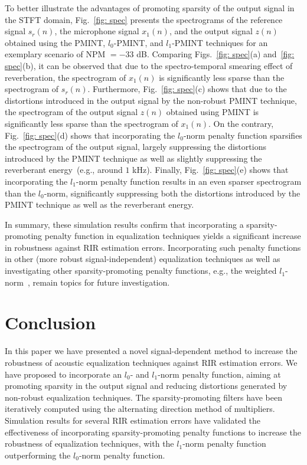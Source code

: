 \documentclass{article}
\begin{document}
To better illustrate the advantages of promoting sparsity of the output signal in the STFT domain, Fig.~\ref{fig: spec} presents the spectrograms of the reference signal $s_r(n)$, the microphone signal $x_1(n)$, and the output signal $z(n)$ obtained using the PMINT, $l_0$-PMINT, and $l_1$-PMINT techniques for an exemplary scenario of NPM $=-33$ dB.
Comparing Figs.~\ref{fig: spec}(a) and~\ref{fig: spec}(b), it can be observed that due to the spectro-temporal smearing effect of reverberation, the spectrogram of $x_1(n)$ is significantly less sparse than the spectrogram of $s_r(n)$.
Furthermore, Fig.~\ref{fig: spec}(c) shows that due to the distortions introduced in the output signal by the non-robust PMINT technique, the spectrogram of the output signal $z(n)$ obtained using PMINT is significantly less sparse than the spectrogram of $x_1(n)$.
On the contrary, Fig.~\ref{fig: spec}(d) shows that incorporating the $l_0$-norm penalty function sparsifies the spectrogram of the output signal, largely suppressing the distortions introduced by the PMINT technique as well as slightly suppressing the reverberant energy~(e.g., around $1$ kHz).
Finally, Fig.~\ref{fig: spec}(e) shows that incorporating the $l_1$-norm penalty function results in an even sparser spectrogram than the $l_0$-norm, significantly suppressing both the distortions introduced by the PMINT technique as well as the reverberant energy.

In summary, these simulation results confirm that incorporating a sparsity-promoting penalty function in equalization techniques yields a significant increase in robustness against RIR estimation errors. 
Incorporating such penalty functions in other (more robust signal-independent) equalization techniques as well as investigating other sparsity-promoting penalty functions, e.g., the weighted $l_1$-norm~\cite{Candes_FA_2008}, remain topics for future investigation.

\section{Conclusion}
In this paper we have presented a novel signal-dependent method to increase the robustness of acoustic equalization techniques against RIR estimation errors.
We have proposed to incorporate an $l_0$- and $l_1$-norm penalty function, aiming at promoting sparsity in the output signal and reducing distortions generated by non-robust equalization techniques.
The sparsity-promoting filters have been iteratively computed using the alternating direction method of multipliers.
Simulation results for several RIR estimation errors have validated the effectiveness of incorporating sparsity-promoting penalty functions to increase the robustness of equalization techniques, with the $l_1$-norm penalty function outperforming the $l_0$-norm penalty function.
\end{document}
